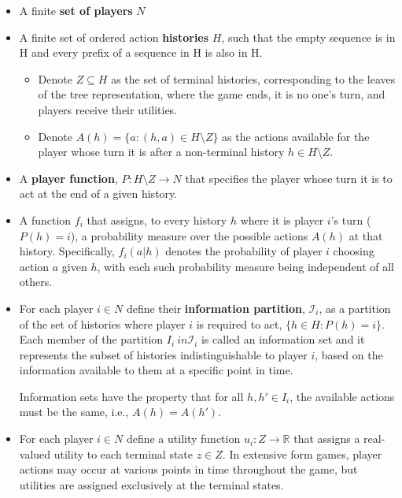 \documentclass{article}
\begin{document}
\begin{itemize}
\item A finite \textbf{set of players} $N$
\item A finite set of ordered action \textbf{histories} $H$, such that the empty sequence is in H and every prefix of a sequence in H is also in H. 
\begin{itemize}
\item Denote $Z \subseteq H$ as the set of terminal histories, corresponding to the leaves of the tree representation, where the game ends, it is no one's turn, and players receive their utilities.
\item Denote $A(h) = \{ a : (h,a) \in H \setminus Z\}$ as the actions available for the player whose turn it is after a non-terminal history $h \in H \setminus Z$.
\end{itemize}

\item A \textbf{player function}, $P: H \setminus Z \rightarrow N$ that specifies the player whose turn it is to act at the end of a given history.

\item A function $f_i$ that assigns, to every history $h$ where it is player $i$'s turn ($P(h) = i$), a probability measure over the possible actions $A(h)$ at that history. Specifically, $f_i(a|h)$ denotes the probability of player $i$ choosing action $a$ given $h$, with each such probability measure being independent of all others.


\item For each player $i \in N$ define their \textbf{information partition}, $\mathcal{I}_i$, as a partition of the set of histories where player $i$ is required to act, $\{ h \in H : P(h) = i \}$. Each member of the partition $I_i \ in \mathcal{I}_i$ is called an information set and it 
represents the subset of histories indistinguishable to player $i$, based on the information available to them at a specific point in time.

Information sets have the property that for all $h, h' \in I_i$, the available actions must be the same, i.e., $A(h) = A(h')$. 
\item For each player $i \in N$ define a utility function $u_i: Z \rightarrow \mathbb{R}$ that assigns a real-valued utility to each terminal state $z \in Z$. In extensive form games, player actions may occur at various points in time throughout the game, but utilities are assigned exclusively at the terminal states.
\end{itemize}
\end{document}
